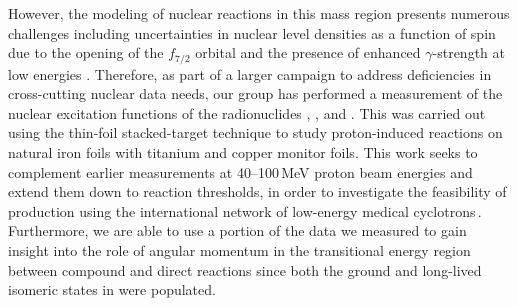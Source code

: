 However, the modeling of nuclear reactions in this mass region presents numerous challenges including uncertainties in nuclear level densities as a function of spin due to the opening of the $f_{7/2}$ orbital and the presence of enhanced $\gamma$-strength at low energies \cite{voinov, tavukcu}.  
Therefore, as part of a larger campaign to address deficiencies in cross-cutting nuclear data needs, our group has performed a   measurement of the   nuclear excitation functions of the radionuclides ,   , and .
This was carried out 
using the thin-foil stacked-target technique to study proton-induced reactions on 
natural iron foils with titanium and copper monitor foils.
This work seeks to complement 
earlier measurements at 40--100\,MeV proton beam energies and extend them down to reaction thresholds, in order to investigate the feasibility of production using the international network   of low-energy medical cyclotrons\,\cite{Graves2016}. 
Furthermore, we are able to use a portion of the data we measured to gain insight into the role of angular momentum in the transitional energy region between compound and direct reactions since both the ground and long-lived isomeric states in  were populated.  


